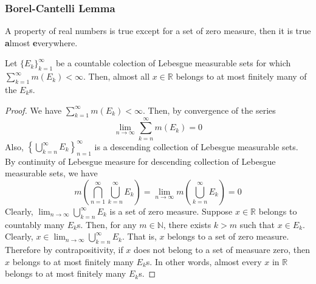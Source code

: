 \subsubsection{Borel-Cantelli Lemma}
\begin{definition}[ae]
	A property of real numbers is true except for a set of zero measure, then it is true \textbf{a}lmost \textbf{e}verywhere.
\end{definition}

\begin{lemma}
	Let $\{E_k\}_{k=1}^\infty$ be a countable colection of Lebesgue measurable sets for which $\sum_{k=1}^\infty m(E_k) < \infty$.
	Then, almost all $x \in \mathbb{R}$ belongs to at most finitely many of the $E_k$s.
\end{lemma}
\begin{proof}
	We have $\sum_{k=1}^\infty m(E_k) < \infty$.
	Then, by convergence of the series 
	$$\lim_{n \to \infty} \sum_{k=n}^\infty m(E_k) = 0$$
	Also, $\displaystyle \left\{ \bigcup_{k=n}^\infty E_k \right\}_{n=1}^\infty$ is a descending collection of Lebesgue measurable sets.
	By continuity of Lebesgue measure for descending collection of Lebesgue measurable sets, we have
	\begin{equation*}
		m \left( \bigcap_{n=1}^\infty \bigcup_{k=n}^\infty E_k \right) = \lim_{n \to \infty} m \left( \bigcup_{k=n}^\infty E_k \right) = 0
	\end{equation*}
	Clearly, $\displaystyle \lim_{n \to \infty} \bigcup_{k =n}^\infty E_k$ is a set of zero measure.
	Suppose $x \in \mathbb{R}$ belongs to countably many $E_k$s.
	Then, for any $m \in \mathbb{N}$, there exists $k > m$ such that  $x \in E_k$.
	Clearly, $\displaystyle x \in \lim_{n \to \infty} \bigcup_{k=n}^\infty E_k$.
	That is, $x$ belongs to a set of zero measure.
	Therefore by contrapositivity, if $x$ does not belong to a set of measuare zero, then $x$ belongs to at most finitely many $E_k$s.	
	In other words, almost every $x$ in $\mathbb{R}$ belongs to at most finitely many $E_k$s.
\end{proof}

